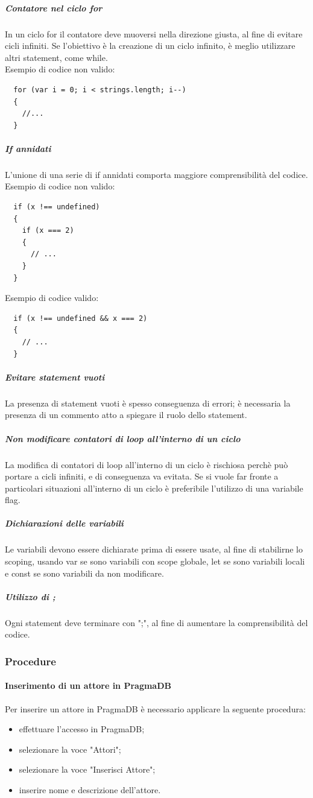 \subparagraph{Contatore nel ciclo for}
In un ciclo for il contatore deve muoversi nella direzione giusta, al fine di evitare cicli infiniti. Se l'obiettivo è la creazione di un ciclo infinito, è meglio utilizzare altri statement, come while.\\
Esempio di codice non valido:
\begin{verbatim}
  for (var i = 0; i < strings.length; i--) 
  { 
    //...
  }
\end{verbatim}

\subparagraph{If annidati}
L'unione di una serie di if annidati comporta maggiore comprensibilità del codice.\\
Esempio di codice non valido:
\begin{verbatim}
  if (x !== undefined) 
  {
    if (x === 2) 
    {
      // ...
    }
  }
\end{verbatim}
Esempio di codice valido:
\begin{verbatim}
  if (x !== undefined && x === 2) 
  {
    // ...
  }
\end{verbatim}
\subparagraph{Evitare statement vuoti}
La presenza di statement vuoti è spesso conseguenza di errori; è necessaria la presenza di un commento atto a spiegare il ruolo dello statement.

\subparagraph{Non modificare contatori di loop all'interno di un ciclo}
La modifica di contatori di loop all'interno di un ciclo è rischiosa perchè può portare a cicli infiniti, e di conseguenza va evitata. Se si vuole far fronte a particolari situazioni all'interno di un ciclo è preferibile l'utilizzo di una variabile flag.

\subparagraph{Dichiarazioni delle variabili}
Le variabili devono essere dichiarate prima di essere usate, al fine di stabilirne lo scoping, usando var se sono variabili con scope globale, let se sono variabili locali e const se sono variabili da non modificare.
\subparagraph{Utilizzo di ;}
Ogni statement deve terminare con ";", al fine di aumentare la comprensibilità del codice.
 \subsubsection{Procedure}
 \paragraph{Inserimento di un attore in PragmaDB}
 Per inserire un attore in PragmaDB è necessario applicare la seguente procedura:
 \begin{itemize}
 	\item effettuare l'accesso in PragmaDB;
 	\item selezionare la voce "Attori";
 	\item selezionare la voce "Inserisci Attore";
 	\item inserire nome e descrizione dell'attore.
 \end{itemize}

